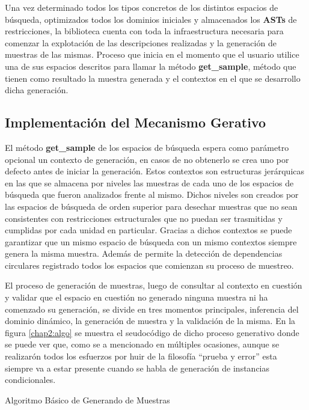 Una vez determinado todos los tipos concretos de los distintos espacios de búsqueda, optimizados todos los dominios iniciales y
almacenados los {\bf ASTs} de restricciones, la biblioteca cuenta con toda la infraestructura necesaria para comenzar la explotación
de las descripciones realizadas y la generación de muestras de las mismas. Proceso que inicia en el momento que el usuario
utilice una de sus espacios descritos para llamar la método {\bf get\_sample}, método que tienen como resultado la muestra generada y
el contextos en el que se desarrollo dicha generación.

\subsection{Implementación del Mecanismo Gerativo}

El método {\bf get\_sample} de los espacios de búsqueda espera como parámetro opcional un contexto de generación, en casos de no
obtenerlo se crea uno por defecto antes de iniciar la generación. Estos contextos son estructuras jerárquicas en las que se
almacena por niveles las muestras de cada uno de los espacios de búsqueda que fueron analizados frente al mismo. Dichos niveles
son creados por las espacios de búsqueda de orden superior para desechar muestras que no sean consistentes con restricciones
estructurales que no puedan ser trasmitidas y cumplidas por cada unidad en particular. Gracias a dichos contextos se puede
garantizar que un mismo espacio de búsqueda con un mismo contextos siempre genera la misma muestra. Además de permite la
detección de dependencias circulares registrado todos los espacios que comienzan su proceso de muestreo.

El proceso de generación de muestras, luego de consultar al contexto en cuestión y validar que el espacio en cuestión no
generado ninguna muestra ni ha comenzado su generación, se divide en tres momentos principales, inferencia del dominio
dinámico, la generación de muestra y la validación de la misma. En la figura \ref{chap2:algo} se muestra el seudocódigo de dicho
proceso generativo donde se puede ver que, como se a mencionado en múltiples ocasiones, aunque se realizarón todos los
esfuerzos por huir de la filosofía “prueba y error” esta siempre va a estar presente cuando se habla de generación de
instancias condicionales.

\begin{algorithm}[H]
    \SetAlgoLined
    \caption{Algoritmo Básico de Generando de Muestras\label{chap2:algo}}
\end{algorithm}


